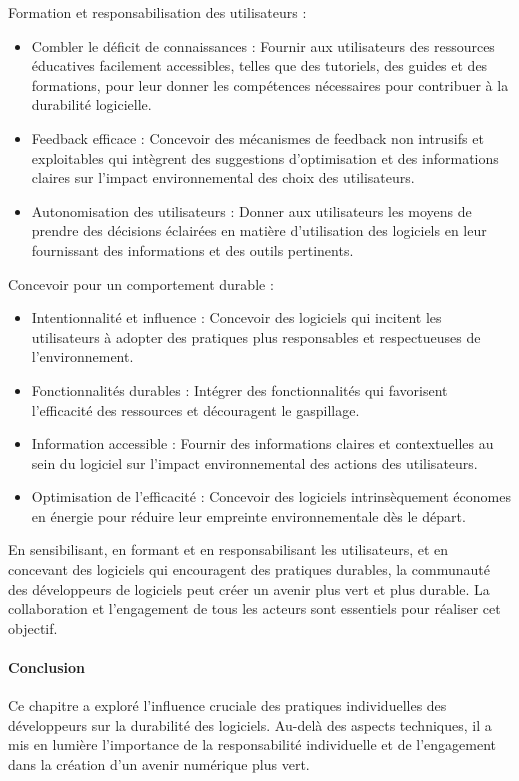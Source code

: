 Formation et responsabilisation des utilisateurs :
\begin{itemize}
    \item Combler le déficit de connaissances : Fournir aux utilisateurs des ressources éducatives facilement accessibles, telles que des tutoriels, des guides et des formations, pour leur donner les compétences nécessaires pour contribuer à la durabilité logicielle.
    \item Feedback efficace : Concevoir des mécanismes de feedback non intrusifs et exploitables qui intègrent des suggestions d'optimisation et des informations claires sur l'impact environnemental des choix des utilisateurs.
    \item Autonomisation des utilisateurs : Donner aux utilisateurs les moyens de prendre des décisions éclairées en matière d'utilisation des logiciels en leur fournissant des informations et des outils pertinents.
\end{itemize}


Concevoir pour un comportement durable :
\begin{itemize}
    \item Intentionnalité et influence : Concevoir des logiciels qui incitent les utilisateurs à adopter des pratiques plus responsables et respectueuses de l'environnement.
    \item Fonctionnalités durables : Intégrer des fonctionnalités qui favorisent l'efficacité des ressources et découragent le gaspillage.
    \item Information accessible : Fournir des informations claires et contextuelles au sein du logiciel sur l'impact environnemental des actions des utilisateurs.
    \item Optimisation de l'efficacité : Concevoir des logiciels intrinsèquement économes en énergie pour réduire leur empreinte environnementale dès le départ.
\end{itemize}


En sensibilisant, en formant et en responsabilisant les utilisateurs, et en concevant des logiciels qui encouragent des pratiques durables, la communauté des développeurs de logiciels peut créer un avenir plus vert et plus durable. La collaboration et l'engagement de tous les acteurs sont essentiels pour réaliser cet objectif.


\paragraph{Conclusion}
Ce chapitre a exploré l'influence cruciale des pratiques individuelles des développeurs sur la durabilité des logiciels. Au-delà des aspects techniques, il a mis en lumière l'importance de la responsabilité individuelle et de l'engagement dans la création d'un avenir numérique plus vert.


